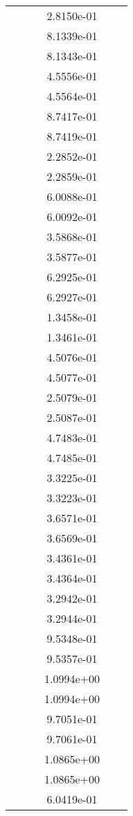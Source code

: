 \begin{xltabular}{\textwidth}{r|rS[table-format=1.3e+2]S[table-format=1.4e+2]S[table-format=1.4e+2]S[table-format=-1.5]}
&  &  & 2.8150e-01 & & \\
&  &  & 8.1339e-01 & & \\
&  &  & 8.1343e-01 & & \\
&  &  & 4.5556e-01 & & \\
&  &  & 4.5564e-01 & & \\
&  &  & 8.7417e-01 & & \\
&  &  & 8.7419e-01 & & \\
&  &  & 2.2852e-01 & & \\
&  &  & 2.2859e-01 & & \\
&  &  & 6.0088e-01 & & \\
&  &  & 6.0092e-01 & & \\
&  &  & 3.5868e-01 & & \\
&  &  & 3.5877e-01 & & \\
&  &  & 6.2925e-01 & & \\
&  &  & 6.2927e-01 & & \\
&  &  & 1.3458e-01 & & \\
&  &  & 1.3461e-01 & & \\
&  &  & 4.5076e-01 & & \\
&  &  & 4.5077e-01 & & \\
&  &  & 2.5079e-01 & & \\
&  &  & 2.5087e-01 & & \\
&  &  & 4.7483e-01 & & \\
&  &  & 4.7485e-01 & & \\
&  &  & 3.3225e-01 & & \\
&  &  & 3.3223e-01 & & \\
&  &  & 3.6571e-01 & & \\
&  &  & 3.6569e-01 & & \\
&  &  & 3.4361e-01 & & \\
&  &  & 3.4364e-01 & & \\
&  &  & 3.2942e-01 & & \\
&  &  & 3.2944e-01 & & \\
&  &  & 9.5348e-01 & & \\
&  &  & 9.5357e-01 & & \\
&  &  & 1.0994e+00 & & \\
&  &  & 1.0994e+00 & & \\
&  &  & 9.7051e-01 & & \\
&  &  & 9.7061e-01 & & \\
&  &  & 1.0865e+00 & & \\
&  &  & 1.0865e+00 & & \\
&  &  & 6.0419e-01 & & \\

\end{xltabular}
